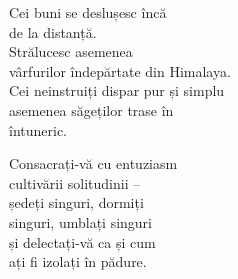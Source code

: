 Cei buni se deslușesc încă\\
de la distanță.\\
Strălucesc asemenea\\
vârfurilor îndepărtate din Himalaya.\\
Cei neinstruiți dispar pur și simplu\\
asemenea săgeților trase în\\
întuneric.


Consacrați-vă cu entuziasm\\
cultivării solitudinii –\\
ședeți singuri, dormiți\\
singuri, umblați singuri\\
și delectați-vă ca și cum\\
ați fi izolați în pădure.
